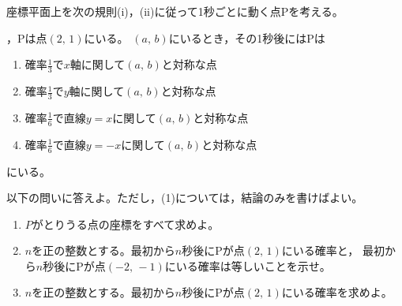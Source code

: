 \documentclass[../../main.tex]{subfiles}
\begin{document}
座標平面上を次の規則(i)，(ii)に従って1秒ごとに動く点Pを考える。
\begin{enumerate}
  ，Pは点$(2, \, 1)$にいる。
  $(a, \, b)$にいるとき，その1秒後にはPは
    \begin{enumerate}
      \item[●]確率$\displaystyle\frac{1}{3}$で$x$軸に関して$(a, \, b)$と対称な点
      \item[●]確率$\displaystyle\frac{1}{3}$で$y$軸に関して$(a, \, b)$と対称な点
      \item[●]確率$\displaystyle\frac{1}{6}$で直線$y=x$に関して$(a, \, b)$と対称な点
      \item[●]確率$\displaystyle\frac{1}{6}$で直線$y=-x$に関して$(a, \, b)$と対称な点
    \end{enumerate}
    にいる。
\end{enumerate}
以下の問いに答えよ。ただし，(1)については，結論のみを書けばよい。
\begin{enumerate}
  \item$P$がとりうる点の座標をすべて求めよ。
  \item$n$を正の整数とする。最初から$n$秒後にPが点$(2, \, 1)$にいる確率と，
    最初から$n$秒後にPが点$(-2, \, -1)$にいる確率は等しいことを示せ。
  \item$n$を正の整数とする。最初から$n$秒後にPが点$(2, \, 1)$にいる確率を求めよ。
\end{enumerate}
\end{document}

